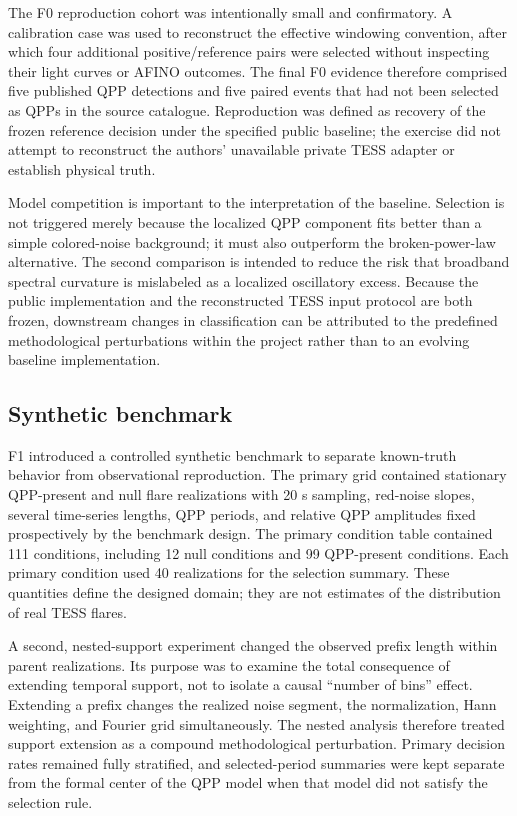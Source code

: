 \documentclass[11pt,a4paper]{article}
\begin{document}
The F0 reproduction cohort was intentionally small and confirmatory. A calibration case was used to reconstruct the effective windowing convention, after which four additional positive/reference pairs were selected without inspecting their light curves or AFINO outcomes. The final F0 evidence therefore comprised five published QPP detections and five paired events that had not been selected as QPPs in the source catalogue. Reproduction was defined as recovery of the frozen reference decision under the specified public baseline; the exercise did not attempt to reconstruct the authors' unavailable private TESS adapter or establish physical truth.

Model competition is important to the interpretation of the baseline. Selection is not triggered merely because the localized QPP component fits better than a simple colored-noise background; it must also outperform the broken-power-law alternative. The second comparison is intended to reduce the risk that broadband spectral curvature is mislabeled as a localized oscillatory excess. Because the public implementation and the reconstructed TESS input protocol are both frozen, downstream changes in classification can be attributed to the predefined methodological perturbations within the project rather than to an evolving baseline implementation.

\subsection{Synthetic benchmark}
F1 introduced a controlled synthetic benchmark to separate known-truth behavior from observational reproduction. The primary grid contained stationary QPP-present and null flare realizations with 20 s sampling, red-noise slopes, several time-series lengths, QPP periods, and relative QPP amplitudes fixed prospectively by the benchmark design. The primary condition table contained 111 conditions, including 12 null conditions and 99 QPP-present conditions. Each primary condition used 40 realizations for the selection summary. These quantities define the designed domain; they are not estimates of the distribution of real TESS flares.

A second, nested-support experiment changed the observed prefix length within parent realizations. Its purpose was to examine the total consequence of extending temporal support, not to isolate a causal ``number of bins'' effect. Extending a prefix changes the realized noise segment, the normalization, Hann weighting, and Fourier grid simultaneously. The nested analysis therefore treated support extension as a compound methodological perturbation. Primary decision rates remained fully stratified, and selected-period summaries were kept separate from the formal center of the QPP model when that model did not satisfy the selection rule.
\end{document}
